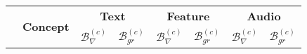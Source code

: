 \begin{table}[H]
    \begin{tabular}{|c|c|c|c|c|c|c|c|}
        \hline
        \multirow{2}{*}{} & \multirow{2}{*}{\textbf{Concept}} & \multicolumn{2}{c|}{\textbf{Text}}                         & \multicolumn{2}{c|}{\textbf{Feature}} & \multicolumn{2}{c|}{\textbf{Audio}}                                                                                                                                                                     \\ \cline{3-8}
                          &                                   & \multicolumn{1}{c|}{\textbf{$\mathcal{B}^{(c)}_{\nabla}$}} & \textbf{$\mathcal{B}^{(c)}_{gr}$}     & \multicolumn{1}{c|}{\textbf{$\mathcal{B}^{(c)}_{\nabla}$}} & \textbf{$\mathcal{B}^{(c)}_{gr}$}     & \multicolumn{1}{c|}{\textbf{$\mathcal{B}^{(c)}_{\nabla}$}} & \textbf{$\mathcal{B}^{(c)}_{gr}$}     \\ \hline


\end{tabular}
\end{table}
